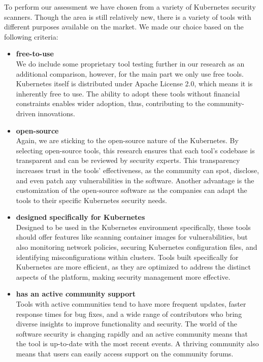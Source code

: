 To perform our assessment we have chosen from a variety of Kubernetes security scanners. Though the area is still relatively new, there is a variety of tools with different purposes available on the market. We made our choice based on the following criteria:
\begin{itemize}
\item \textbf{free-to-use} \\
We do include some proprietary tool testing further in our research as an additional comparison, however, for the main part we only use free tools. Kubernetes itself is distributed under Apache License 2.0, which means it is inherently free to use. The ability to adopt these tools without financial constraints enables wider adoption, thus, contributing to the community-driven innovations.
\item \textbf{open-source} \\
Again, we are sticking to the open-source nature of the Kubernetes. By selecting open-source tools, this research ensures that each tool's codebase is transparent and can be reviewed by security experts. This transparency increases trust in the tools' effectiveness, as the community can spot, disclose, and even patch any vulnerabilities in the software. Another advantage is the customization of the open-source software as the companies can adapt the tools to their specific Kubernetes security needs.
\item \textbf{designed specifically for Kubernetes} \\
Designed to be used in the Kubernetes environment specifically, these tools should offer features like scanning container images for vulnerabilities, but also monitoring network policies, securing Kubernetes configuration files, and identifying misconfigurations within clusters. Tools built specifically for Kubernetes are more efficient, as they are optimized to address the distinct aspects of the platform, making security management more effective.
\item \textbf{has an active community support} \\
Tools with active communities tend to have more frequent updates, faster response times for bug fixes, and a wide range of contributors who bring diverse insights to improve functionality and security. The world of the software security is changing rapidly and an active community means that the tool is up-to-date with the most recent events. A thriving community also means that users can easily access support on the community forums.
\end{itemize}


